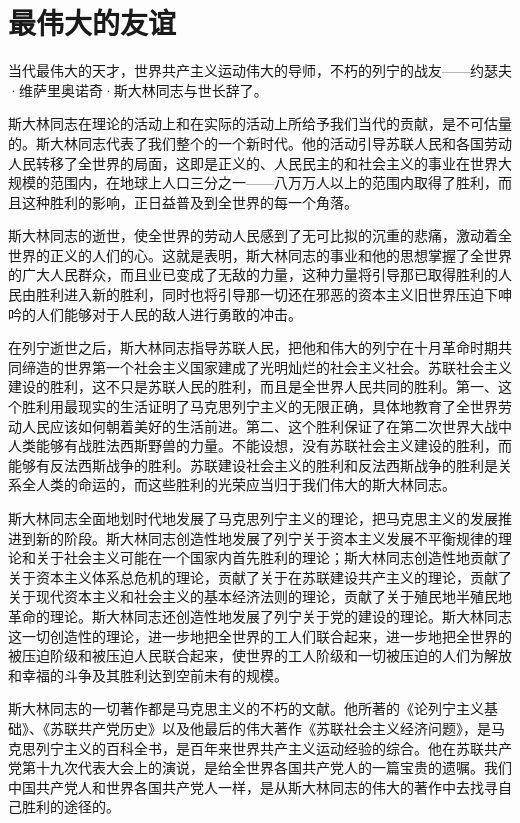 \section[最伟大的友谊（一九五三年三月九日）]{最伟大的友谊}


当代最伟大的天才，世界共产主义运动伟大的导师，不朽的列宁的战友——约瑟夫·维萨里奥诺奇·斯大林同志与世长辞了。

斯大林同志在理论的活动上和在实际的活动上所给予我们当代的贡献，是不可估量的。斯大林同志代表了我们整个的一个新时代。他的活动引导苏联人民和各国劳动人民转移了全世界的局面，这即是正义的、人民民主的和社会主义的事业在世界大规模的范围内，在地球上人口三分之一——八万万人以上的范围内取得了胜利，而且这种胜利的影响，正日益普及到全世界的每一个角落。

斯大林同志的逝世，使全世界的劳动人民感到了无可比拟的沉重的悲痛，激动着全世界的正义的人们的心。这就是表明，斯大林同志的事业和他的思想掌握了全世界的广大人民群众，而且业已变成了无敌的力量，这种力量将引导那已取得胜利的人民由胜利进入新的胜利，同时也将引导那一切还在邪恶的资本主义旧世界压迫下呻吟的人们能够对于人民的敌人进行勇敢的冲击。

在列宁逝世之后，斯大林同志指导苏联人民，把他和伟大的列宁在十月革命时期共同缔造的世界第一个社会主义国家建成了光明灿烂的社会主义社会。苏联社会主义建设的胜利，这不只是苏联人民的胜利，而且是全世界人民共同的胜利。第一、这个胜利用最现实的生活证明了马克思列宁主义的无限正确，具体地教育了全世界劳动人民应该如何朝着美好的生活前进。第二、这个胜利保证了在第二次世界大战中人类能够有战胜法西斯野兽的力量。不能设想，没有苏联社会主义建设的胜利，而能够有反法西斯战争的胜利。苏联建设社会主义的胜利和反法西斯战争的胜利是关系全人类的命运的，而这些胜利的光荣应当归于我们伟大的斯大林同志。

斯大林同志全面地划时代地发展了马克思列宁主义的理论，把马克思主义的发展推进到新的阶段。斯大林同志创造性地发展了列宁关于资本主义发展不平衡规律的理论和关于社会主义可能在一个国家内首先胜利的理论；斯大林同志创造性地贡献了关于资本主义体系总危机的理论，贡献了关于在苏联建设共产主义的理论，贡献了关于现代资本主义和社会主义的基本经济法则的理论，贡献了关于殖民地半殖民地革命的理论。斯大林同志还创造性地发展了列宁关于党的建设的理论。斯大林同志这一切创造性的理论，进一步地把全世界的工人们联合起来，进一步地把全世界的被压迫阶级和被压迫人民联合起来，使世界的工人阶级和一切被压迫的人们为解放和幸福的斗争及其胜利达到空前未有的规模。

斯大林同志的一切著作都是马克思主义的不朽的文献。他所著的《论列宁主义基础》、《苏联共产党历史》以及他最后的伟大著作《苏联社会主义经济问题》，是马克思列宁主义的百科全书，是百年来世界共产主义运动经验的综合。他在苏联共产党第十九次代表大会上的演说，是给全世界各国共产党人的一篇宝贵的遗嘱。我们中国共产党人和世界各国共产党人一样，是从斯大林同志的伟大的著作中去找寻自己胜利的途径的。

